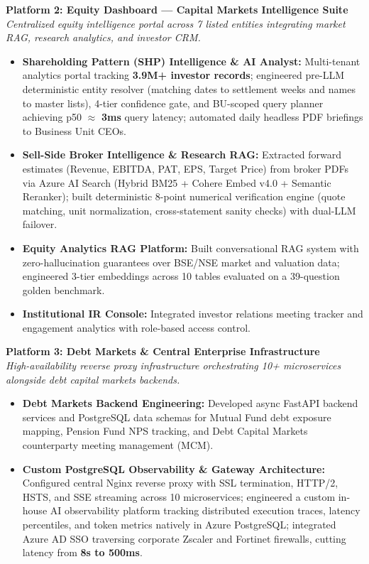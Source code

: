 \documentclass[a4paper,10pt]{article}
\begin{document}
\vspace{5pt}

\noindent
\textbf{\color{projecttitle}Platform 2: Equity Dashboard — Capital Markets Intelligence Suite} \\
\textit{\small Centralized equity intelligence portal across 7 listed entities integrating market RAG, research analytics, and investor CRM.}
\begin{itemize}
    \item \textbf{Shareholding Pattern (SHP) Intelligence \& AI Analyst:} Multi-tenant analytics portal tracking \textbf{3.9M+ investor records}; engineered pre-LLM deterministic entity resolver (matching dates to settlement weeks and names to master lists), 4-tier confidence gate, and BU-scoped query planner achieving p50 $\approx$ \textbf{3ms} query latency; automated daily headless PDF briefings to Business Unit CEOs.
    \item \textbf{Sell-Side Broker Intelligence \& Research RAG:} Extracted forward estimates (Revenue, EBITDA, PAT, EPS, Target Price) from broker PDFs via Azure AI Search (Hybrid BM25 + Cohere Embed v4.0 + Semantic Reranker); built deterministic 8-point numerical verification engine (quote matching, unit normalization, cross-statement sanity checks) with dual-LLM failover.
    \item \textbf{Equity Analytics RAG Platform:} Built conversational RAG system with zero-hallucination guarantees over BSE/NSE market and valuation data; engineered 3-tier embeddings across 10 tables evaluated on a 39-question golden benchmark.
    \item \textbf{Institutional IR Console:} Integrated investor relations meeting tracker and engagement analytics with role-based access control.
\end{itemize}

\vspace{5pt}

\noindent
\textbf{\color{projecttitle}Platform 3: Debt Markets & Central Enterprise Infrastructure} \\
\textit{\small High-availability reverse proxy infrastructure orchestrating 10+ microservices alongside debt capital markets backends.}
\begin{itemize}
    \item \textbf{Debt Markets Backend Engineering:} Developed async FastAPI backend services and PostgreSQL data schemas for Mutual Fund debt exposure mapping, Pension Fund NPS tracking, and Debt Capital Markets counterparty meeting management (MCM).
    \item \textbf{Custom PostgreSQL Observability & Gateway Architecture:} Configured central Nginx reverse proxy with SSL termination, HTTP/2, HSTS, and SSE streaming across 10 microservices; engineered a custom in-house AI observability platform tracking distributed execution traces, latency percentiles, and token metrics natively in Azure PostgreSQL; integrated Azure AD SSO traversing corporate Zscaler and Fortinet firewalls, cutting latency from \textbf{8s to 500ms}.
\end{itemize}
\end{document}
